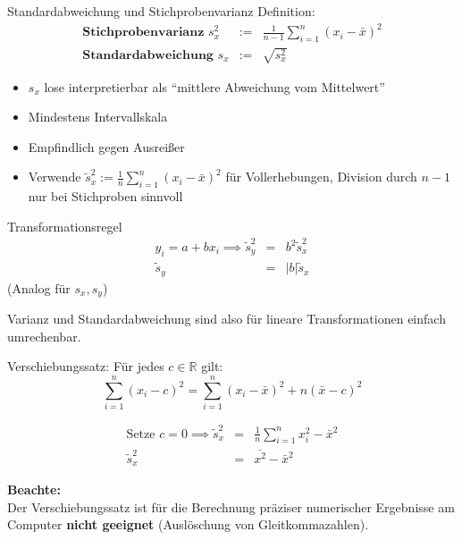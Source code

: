 \documentclass[
  10pt,
  ignorenonframetext,
]{beamer}
\providecommand{\tightlist}{%
  \setlength{\itemsep}{0pt}\setlength{\parskip}{0pt}}
\begin{document}
\begin{frame}{Standardabweichung und Stichprobenvarianz}
\label{standardabweichung-und-stichprobenvarianz}
Definition: \begin{eqnarray*}
\textbf{Stichprobenvarianz } s_x^2 &:=& \frac{1}{n-1} \sum_{i=1}^n (x_i - \bar x)^2 \\
\textbf{Standardabweichung } s_x &:=& \sqrt{s_x^2}
\end{eqnarray*}

\begin{itemize}
\tightlist
\item
  \(s_x\) lose interpretierbar als ``mittlere Abweichung vom
  Mittelwert''
\item
  Mindestens Intervallskala
\item
  Empfindlich gegen Ausreißer
\item
  Verwende
  \(\widetilde{s}_x^2:= \frac{1}{n} \sum_{i=1}^n (x_i - \bar x)^2\) für
  Vollerhebungen, Division durch \(n-1\) nur bei Stichproben sinnvoll
\end{itemize}
\end{frame}

\begin{frame}{Transformationsregel}
\label{transformationsregel}
\begin{eqnarray*}
 y_i = a + bx_i \implies \widetilde s_y^2 &=& b^2 \widetilde s_x^2 \\
   \widetilde s_y &=& |b| \widetilde s_x  
\end{eqnarray*} (Analog für \(s_x, s_y\))

Varianz und Standardabweichung sind also für lineare Transformationen
einfach umrechenbar.
\end{frame}

\begin{frame}{Verschiebungssatz:}
\label{verschiebungssatz}
Für jedes \(c \in \mathbb R\) gilt: \begin{equation*}
  \sum_{i=1}^n (x_i - c)^2 = \sum_{i=1}^n (x_i - \bar x)^2 + n (\bar x -
c)^2
\end{equation*}

\begin{eqnarray*}
\text{Setze }  c=0 \implies \widetilde s_x^2 &=& \frac{1}{n} \sum_{i=1}^n x_i^2 - \bar
x^2 \\
  \widetilde s_x^2 &=& \overline{x^2} - \bar x^2
\end{eqnarray*}

\textbf{Beachte:}\\
Der Verschiebungssatz ist für die Berechnung präziser numerischer
Ergebnisse am Computer \textbf{nicht geeignet} (Auslöschung von
Gleitkommazahlen).
\end{frame}
\end{document}
